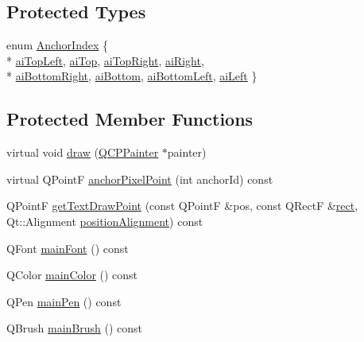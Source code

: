 \subsection*{Protected Types}
\begin{DoxyCompactItemize}
\item 
enum \hyperlink{class_q_c_p_item_text_a14a84e58f72519c8ae1d7a4a1dd23f21}{Anchor\+Index} \{ \\*
\hyperlink{class_q_c_p_item_text_a14a84e58f72519c8ae1d7a4a1dd23f21a30342ee15065715f045cb52eb77b904c}{ai\+Top\+Left}, 
\hyperlink{class_q_c_p_item_text_a14a84e58f72519c8ae1d7a4a1dd23f21a55ce9699c71db6d264eb669bb0eb9aff}{ai\+Top}, 
\hyperlink{class_q_c_p_item_text_a14a84e58f72519c8ae1d7a4a1dd23f21a7b6ff56fcad4c78db0b793a96fce9580}{ai\+Top\+Right}, 
\hyperlink{class_q_c_p_item_text_a14a84e58f72519c8ae1d7a4a1dd23f21ad4faa7def46db6df2fedd1926237b48f}{ai\+Right}, 
\\*
\hyperlink{class_q_c_p_item_text_a14a84e58f72519c8ae1d7a4a1dd23f21af2072f259730ef47aa7ad7519f3a0255}{ai\+Bottom\+Right}, 
\hyperlink{class_q_c_p_item_text_a14a84e58f72519c8ae1d7a4a1dd23f21a5773ad69b7f4cd2724ba46d8f31b0688}{ai\+Bottom}, 
\hyperlink{class_q_c_p_item_text_a14a84e58f72519c8ae1d7a4a1dd23f21a489ec73da5a18c15e98a4f9b17ed301f}{ai\+Bottom\+Left}, 
\hyperlink{class_q_c_p_item_text_a14a84e58f72519c8ae1d7a4a1dd23f21a7f1c1b8c574c753e300a4759915a9170}{ai\+Left}
 \}
\end{DoxyCompactItemize}
\subsection*{Protected Member Functions}
\begin{DoxyCompactItemize}
\item 
virtual void \hyperlink{class_q_c_p_item_text_a8793adb271ab79b4cf391dc55e9987f1}{draw} (\hyperlink{class_q_c_p_painter}{Q\+C\+P\+Painter} $\ast$painter)
\item 
virtual Q\+Point\+F \hyperlink{class_q_c_p_item_text_ad248f988534a9d07bc7c220a2457142a}{anchor\+Pixel\+Point} (int anchor\+Id) const 
\item 
Q\+Point\+F \hyperlink{class_q_c_p_item_text_aa6e478b1ce198eace89157c4cacc3ddc}{get\+Text\+Draw\+Point} (const Q\+Point\+F \&pos, const Q\+Rect\+F \&\hyperlink{_gen_blob_8m_aea8f6815d9a63491fc422c5572c6b3c3}{rect}, Qt\+::\+Alignment \hyperlink{class_q_c_p_item_text_af13c6adc480f268116ae72196eb44b06}{position\+Alignment}) const 
\item 
Q\+Font \hyperlink{class_q_c_p_item_text_a23d391bd6471c45e73f45add67ede902}{main\+Font} () const 
\item 
Q\+Color \hyperlink{class_q_c_p_item_text_ad7bf17e4945cc86bbf9a36331da059a0}{main\+Color} () const 
\item 
Q\+Pen \hyperlink{class_q_c_p_item_text_a9ade32d362b22853659201c738269e2a}{main\+Pen} () const 
\item 
Q\+Brush \hyperlink{class_q_c_p_item_text_a10d6585a030633aa79d5ebc5a437f183}{main\+Brush} () const 
\end{DoxyCompactItemize}
